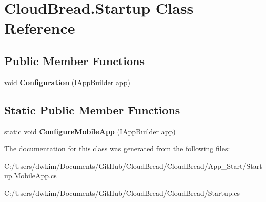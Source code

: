 \hypertarget{class_cloud_bread_1_1_startup}{}\section{Cloud\+Bread.\+Startup Class Reference}
\label{class_cloud_bread_1_1_startup}
\subsection*{Public Member Functions}
\begin{DoxyCompactItemize}
\item 
void {\bfseries Configuration} (I\+App\+Builder app)\hypertarget{class_cloud_bread_1_1_startup_a6731744fcca213fea7ff5df81f4d762c}{}\label{class_cloud_bread_1_1_startup_a6731744fcca213fea7ff5df81f4d762c}

\end{DoxyCompactItemize}
\subsection*{Static Public Member Functions}
\begin{DoxyCompactItemize}
\item 
static void {\bfseries Configure\+Mobile\+App} (I\+App\+Builder app)\hypertarget{class_cloud_bread_1_1_startup_a56296177abc17b5405fdce16c947df5b}{}\label{class_cloud_bread_1_1_startup_a56296177abc17b5405fdce16c947df5b}

\end{DoxyCompactItemize}


The documentation for this class was generated from the following files\+:\begin{DoxyCompactItemize}
\item 
C\+:/\+Users/dwkim/\+Documents/\+Git\+Hub/\+Cloud\+Bread/\+Cloud\+Bread/\+App\+\_\+\+Start/Startup.\+Mobile\+App.\+cs\item 
C\+:/\+Users/dwkim/\+Documents/\+Git\+Hub/\+Cloud\+Bread/\+Cloud\+Bread/Startup.\+cs\end{DoxyCompactItemize}
